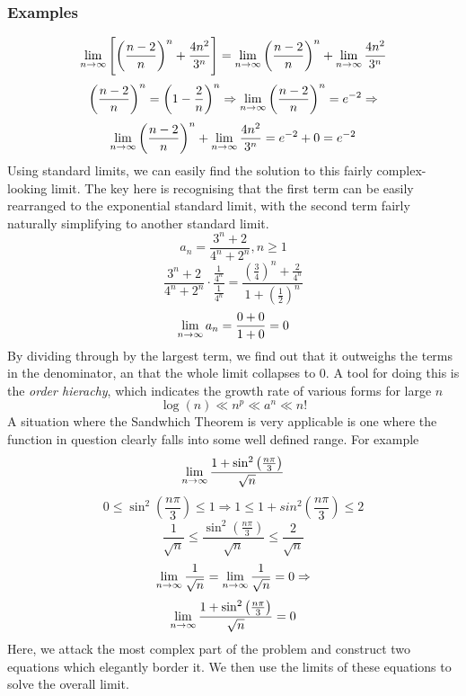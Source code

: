 \documentclass[12pt]{report}
\begin{document}
\begin{flushleft}
\subsubsection*{Examples}
\[\lim\limits_{n\rightarrow\infty}\left[\left(\frac{n - 2}{n}\right)^n 
+ \frac{4n^2}{3^n}\right] = 
\lim\limits_{n\rightarrow\infty} \left(\frac{n - 2}{n}\right)^n + 
\lim\limits_{n\rightarrow\infty} \frac{4n^2}{3^n}\]
\[\left(\frac{n - 2}{n}\right)^n = \left(1 - \frac{2}{n}\right)^n \Rightarrow
\lim\limits_{n\rightarrow\infty} \left(\frac{n - 2}{n}\right)^n = e^{-2} 
\Rightarrow\]
\[\lim\limits_{n\rightarrow\infty} \left(\frac{n - 2}{n}\right)^n + 
\lim\limits_{n\rightarrow\infty} \frac{4n^2}{3^n} = e^{-2} + 0 = e^{-2}\]
Using standard limits, we can easily find the solution to this fairly 
complex-looking limit. The key here is recognising that the first term can
be easily rearranged to the exponential standard limit, with the second term
fairly naturally simplifying to another standard limit.
\[a_n = \frac{3^n + 2}{4^n + 2^n}, n \geq 1\]
\[\frac{3^n + 2}{4^n + 2^n}\cdot\frac{\frac{1}{4^n}}{\frac{1}{4^n}} = 
\frac{\left(\frac{3}{4}\right)^n + \frac{2}{4^n}}{1 +
\left(\frac{1}{2}\right)^n}\]
\[\lim\limits_{n\rightarrow\infty} a_n = \frac{0 + 0}{1 + 0} = 0\]
By dividing through by the largest term, we find out that it outweighs the 
terms in the denominator, an that the whole limit collapses to \(0\). A tool
for doing this is the \textit{order hierachy}, which indicates the growth rate
of various forms for large \(n\)
\[\log(n) \ll n^p \ll a^n \ll n!\]
A situation where the Sandwhich Theorem is very applicable is one where the 
function in question clearly falls into some well defined range. For example
\[\lim\limits_{n\rightarrow\infty}\frac{1 + \sin^2\left(\frac{n\pi}{3}\right)}{
\sqrt{n}}\]
\[0 \leq \sin^2\left(\frac{n\pi}{3}\right) \leq 1 \Rightarrow 1 \leq 1 + 
sin^2\left(\frac{n\pi}{3}\right) \leq 2\]
\[\frac{1}{\sqrt{n}} \leq \frac{\sin^2\left(\frac{n\pi}{3}\right)}{\sqrt{n}} 
\leq \frac{2}{\sqrt{n}}\]
\[\lim\limits_{n\rightarrow\infty}\frac{1}{\sqrt{n}} 
= \lim\limits_{n\rightarrow\infty}\frac{1}{\sqrt{n}} = 0 \Rightarrow\]
\[\lim\limits_{n\rightarrow\infty}\frac{1 + \sin^2\left(\frac{n\pi}{3}\right)}{
\sqrt{n}} = 0\]
Here, we attack the most complex part of the problem and construct two 
equations which elegantly border it. We then use the limits of these equations
to solve the overall limit.


\end{flushleft}
\end{document}
